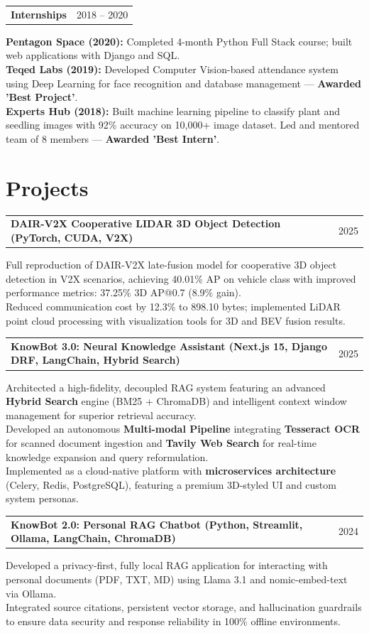 \documentclass[10pt, a4paper]{article}
\makeatletter
\newenvironment{entry}[2]{
  \noindent\begin{tabularx}{\linewidth}{@{}X@{\hspace{1.5em}}r@{}}
    \textbf{#1} & #2 \\
  \end{tabularx}
  \vspace{1pt}
  \noindent\small
}{\vspace{2pt}}
\makeatother
\begin{document}
\begin{entry}{Internships}{2018 – 2020}
  \textbf{Pentagon Space (2020):} Completed 4-month Python Full Stack course; built web applications with Django and SQL. \\
  \textbf{Teqed Labs (2019):} Developed Computer Vision-based attendance system using Deep Learning for face recognition and database management — \textbf{Awarded 'Best Project'}. \\
  \textbf{Experts Hub (2018):} Built machine learning pipeline to classify plant and seedling images with 92\% accuracy on 10,000+ image dataset. Led and mentored team of 8 members — \textbf{Awarded 'Best Intern'}.
\end{entry}

\section{Projects} 

\begin{entry}{DAIR-V2X Cooperative LIDAR 3D Object Detection (PyTorch, CUDA, V2X)}{2025}
  Full reproduction of DAIR-V2X late-fusion model for cooperative 3D object detection in V2X scenarios, achieving 40.01\% AP on vehicle class with improved performance metrics: 37.25\% 3D AP@0.7 (8.9\% gain). \\
  Reduced communication cost by 12.3\% to 898.10 bytes; implemented LiDAR point cloud processing with visualization tools for 3D and BEV fusion results.
\end{entry}

\begin{entry}{KnowBot 3.0: Neural Knowledge Assistant (Next.js 15, Django DRF, LangChain, Hybrid Search)}{2025}
  Architected a high-fidelity, decoupled RAG system featuring an advanced \textbf{Hybrid Search} engine (BM25 + ChromaDB) and intelligent context window management for superior retrieval accuracy. \\
  Developed an autonomous \textbf{Multi-modal Pipeline} integrating \textbf{Tesseract OCR} for scanned document ingestion and \textbf{Tavily Web Search} for real-time knowledge expansion and query reformulation. \\
  Implemented as a cloud-native platform with \textbf{microservices architecture} (Celery, Redis, PostgreSQL), featuring a premium 3D-styled UI and custom system personas.
\end{entry}

\begin{entry}{KnowBot 2.0: Personal RAG Chatbot (Python, Streamlit, Ollama, LangChain, ChromaDB)}{2024}
  Developed a privacy-first, fully local RAG application for interacting with personal documents (PDF, TXT, MD) using Llama 3.1 and nomic-embed-text via Ollama. \\
  Integrated source citations, persistent vector storage, and hallucination guardrails to ensure data security and response reliability in 100\% offline environments.
\end{entry}
\end{document}
